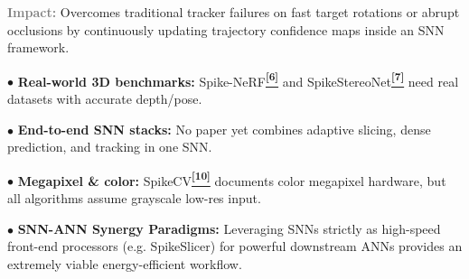 \documentclass[final]{beamer}
\newcommand{\paper}[1]{\hyperlink{ref:#1}{\textcolor{TealAccent}{\textsuperscript{\textbf{[#1]}}}}}
\newlength{\CW}\setlength{\CW}{38.0cm}    %
\newlength{\FW}\setlength{\FW}{119.0cm}   %
\begin{document}
\begin{frame}[t]{}
\begin{columns}[T,totalwidth=\FW]
\begin{column}{\CW}
\begin{tcolorbox}[pbox=TrackCol,
  title={High-Level Vision — Multi-Object Tracking\paper{9}}]
\smallskip
\textcolor{gray}{\textbf{Impact:}} Overcomes traditional tracker failures on fast target rotations or abrupt occlusions by continuously updating trajectory confidence maps inside an SNN framework.
\end{tcolorbox}

\vspace{0.12cm}

\begin{tcolorbox}[pbox=NavyBlue,
  title={Open Problems and Future Directions}]
\normalsize
$\bullet$ \textbf{Real-world 3D benchmarks:} Spike-NeRF\paper{6} and SpikeStereoNet\paper{7} need real datasets with accurate depth/pose.

\medskip
$\bullet$ \textbf{End-to-end SNN stacks:} No paper yet combines adaptive slicing, dense prediction, and tracking in one SNN.

\medskip
$\bullet$ \textbf{Megapixel \& color:} SpikeCV\paper{10} documents color megapixel hardware, but all algorithms assume grayscale low-res input.

\medskip
$\bullet$ \textbf{SNN-ANN Synergy Paradigms:} Leveraging SNNs strictly as high-speed front-end processors (e.g. SpikeSlicer) for powerful downstream ANNs provides an extremely viable energy-efficient workflow.
\end{tcolorbox}

\end{column}
\end{columns}


\end{frame}
\end{document}
